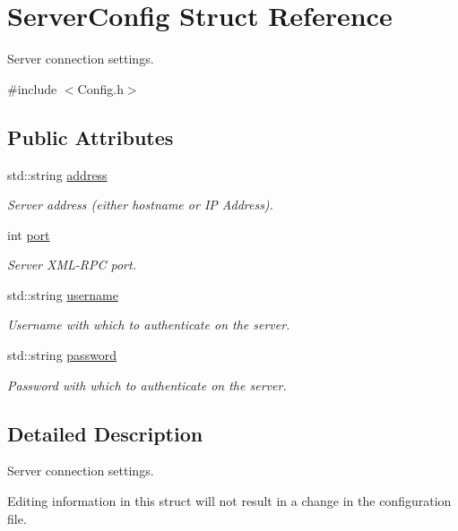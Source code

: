 \hypertarget{structServerConfig}{\section{Server\-Config Struct Reference}
\label{structServerConfig}
}


Server connection settings.  




{\ttfamily \#include $<$Config.\-h$>$}

\subsection*{Public Attributes}
\begin{DoxyCompactItemize}
\item 
std\-::string \hyperlink{structServerConfig_a2a4201c0c868ba962a57d75b07ddafaf}{address}
\begin{DoxyCompactList}\small\item\em Server address (either hostname or I\-P Address). \end{DoxyCompactList}\item 
int \hyperlink{structServerConfig_ae459946703124ef5a1d98dba38a8b493}{port}
\begin{DoxyCompactList}\small\item\em Server X\-M\-L-\/\-R\-P\-C port. \end{DoxyCompactList}\item 
std\-::string \hyperlink{structServerConfig_ad2216f13f13acbe6bfd61f275bc72e27}{username}
\begin{DoxyCompactList}\small\item\em Username with which to authenticate on the server. \end{DoxyCompactList}\item 
std\-::string \hyperlink{structServerConfig_a819f5b912feb1fdb68ebd4fe36eb11ea}{password}
\begin{DoxyCompactList}\small\item\em Password with which to authenticate on the server. \end{DoxyCompactList}\end{DoxyCompactItemize}


\subsection{Detailed Description}
Server connection settings. 

Editing information in this struct will not result in a change in the configuration file. 

